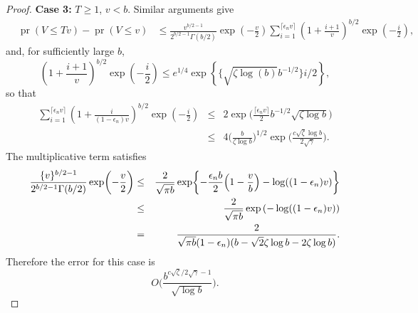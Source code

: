 \documentclass[10pt,a4paper]{amsart}
\newcommand{\pr}{\mathop{\mathrm{pr}}}
\begin{document}
\begin{proof}
	\noindent \textbf{Case 3:} $T \geq 1$, $v < b$. Similar arguments give
	\begin{align*}
		&\pr\left( V \leq Tv \right) - \pr(V \leq v) 
		&\leq \frac{v^{b/2-1}}{2^{b/2 -1}\Gamma(b/2)} \exp\left( -\frac{ v }{2} \right) \sum^{ \lceil \epsilon_n v \rceil}_{  i = 1}  \left(1+ \frac{i + 1}{v} \right)^{b/2} \exp\left(- \frac{i}{2} \right),
	\end{align*}
	and,  for sufficiently large $b$,
	\[
	\left(1+ \frac{i + 1}{v} \right)^{b/2} \exp\left(- \frac{i}{2} \right) \leq e^{1/4}\exp\left\{  \{\sqrt{\zeta\log(b)}b^{-1/2}\} i/2 \right\},
	\]
	so that
	\begin{eqnarray*}
		\sum^{ \lceil \epsilon_n v \rceil}_{  i = 1}  \left(1+ \frac{i}{(1 -\epsilon_n)v} \right)^{b/2} \exp\left(- \frac{i}{2} \right) &\leq& 2 \exp\biggl(\frac{\lceil \epsilon_n v \rceil}{2}  b^{-1/2}\sqrt{\zeta\log b}  \biggr) \\
		&\leq & 4 \biggl(\frac{b}{\zeta\log b}\biggr)^{1/2} \exp \biggl( \frac{c\sqrt{\zeta} \log b}{2\sqrt{\gamma}} \biggr). 
	\end{eqnarray*}
	The multiplicative term satisfies
	\begin{eqnarray*}
		\frac{\{v\}^{b/2-1}}{2^{b/2 -1}\Gamma(b/2)} \exp\biggl( -\frac{v }{2} \biggr) 
		&\leq &\frac{2}{\sqrt{\pi b}} \exp\biggl\{ -\frac{\epsilon_n b}{2} \Bigl(1 - \frac{v}{b}\Bigr) - \log( (1- \epsilon_n)v )  \biggr\}\\
		&\leq & \frac{2}{\sqrt{\pi b}} \exp\left(  - \log( (1- \epsilon_n)v )  \right) \\
		&=&  \frac{2}{\sqrt{\pi b}(1-\epsilon_n)(b - \sqrt2{\zeta\log b} - 2\zeta\log b) }.
	\end{eqnarray*}
	Therefore the error for this case is
	\[
	O\biggl( \frac{b^{c\sqrt{\zeta}/2\sqrt{\gamma} - 1}}{\sqrt{\log b}} \biggr).
	\]
	

\end{proof}
\end{document}
